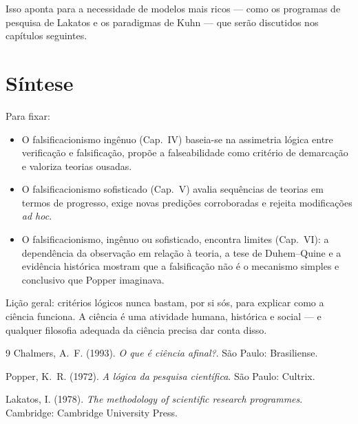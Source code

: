 \documentclass[9pt,a4paper]{extarticle}
\newcommand{\impt}[1]{\textcolor{important}{#1}}
\newcommand{\ntc}[1]{\textcolor{notice}{#1}}
\theoremstyle{definition}
\begin{document}
Isso aponta para a necessidade de modelos mais ricos --- como os \impt{programas de pesquisa} de Lakatos e os \impt{paradigmas} de Kuhn --- que serão discutidos nos capítulos seguintes.

\section{Síntese}

Para fixar:

\begin{itemize}
  \item O \ntc{falsificacionismo ingênuo} (Cap.~IV) baseia-se na assimetria lógica entre verificação e falsificação, propõe a falseabilidade como critério de demarcação e valoriza teorias ousadas.
  \item O \ntc{falsificacionismo sofisticado} (Cap.~V) avalia sequências de teorias em termos de progresso, exige novas predições corroboradas e rejeita modificações \emph{ad hoc}.
  \item O \ntc{falsificacionismo, ingênuo ou sofisticado, encontra limites} (Cap.~VI): a dependência da observação em relação à teoria, a tese de Duhem--Quine e a evidência histórica mostram que a falsificação não é o mecanismo simples e conclusivo que Popper imaginava.
\end{itemize}

\impt{Lição geral:} critérios lógicos nunca bastam, por si sós, para explicar como a ciência funciona. A ciência é uma atividade humana, histórica e social --- e qualquer filosofia adequada da ciência precisa dar conta disso.

\begin{thebibliography}{9}
Chalmers, A.\ F. (1993).
\newblock \emph{O que é ciência afinal?}.
\newblock São Paulo: Brasiliense.

Popper, K.\ R. (1972).
\newblock \emph{A lógica da pesquisa científica}.
\newblock São Paulo: Cultrix.

Lakatos, I. (1978).
\newblock \emph{The methodology of scientific research programmes}.
\newblock Cambridge: Cambridge University Press.
\end{thebibliography}
\end{document}
